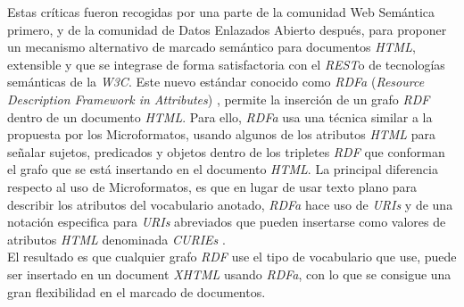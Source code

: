 Estas cr\'iticas fueron recogidas por una parte de la comunidad Web Sem\'antica primero, y de la comunidad de Datos Enlazados Abierto despu\'es, para proponer un mecanismo alternativo de marcado sem\'antico para documentos \textit{HTML}, extensible y que se integrase de forma satisfactoria con el \textit{REST}o de tecnolog\'ias sem\'anticas de la \textit{W3C}. Este nuevo est\'andar conocido como \textit{RDFa} (\textit{Resource Description Framework in Attributes}) \cite{rdfa}, permite la inserci\'on de un grafo \textit{RDF} dentro de un documento \textit{HTML}. Para ello, \textit{RDFa} usa una t\'ecnica similar a la propuesta por los Microformatos, usando algunos de los atributos \textit{HTML} para se\~nalar sujetos, predicados y objetos dentro de los tripletes \textit{RDF} que conforman el grafo que se est\'a insertando en el documento \textit{HTML}. La principal diferencia respecto al uso de Microformatos, es que en lugar de usar texto plano para describir los atributos del vocabulario anotado, \textit{RDFa} hace uso de \textit{URIs} y de una notaci\'on especifica para \textit{URIs} abreviados que pueden insertarse como valores de atributos \textit{HTML} denominada \textit{CURIEs} \cite{curies}.\\
El resultado es que cualquier grafo \textit{RDF} use el tipo de vocabulario que use, puede ser insertado en un document \textit{XHTML} usando \textit{RDFa}, con lo que se consigue una gran flexibilidad en el marcado de documentos.\\
